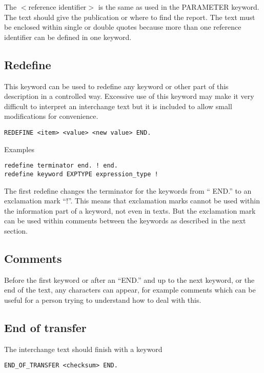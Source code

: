 \documentclass[12pt]{article}
\begin{document}
The $<$reference identifier$>$ is the same as used in the PARAMETER
keyword. The text should give the publication or where to find the
report. The text must be enclosed within single or double quotes
because more than one reference identifier can be defined in one
keyword.

\subsection{Redefine}

This keyword can be used to redefine any keyword or other part of
this description in a controlled way. Excessive use of this
keyword may make it very difficult to interpret an interchange text
but it is included to allow small modifications for convenience.

\begin{verbatim}
REDEFINE <item> <value> <new value> END.
\end{verbatim}

Examples

\begin{verbatim}
redefine terminator end. ! end.
redefine keyword EXPTYPE expression_type !
\end{verbatim}

The first redefine changes the terminator for the keywords from 
`` END.'' to an exclamation mark ``!''. This means that exclamation marks
cannot be used within the information part of a keyword, not even in
texts. But the exclamation mark can be used within comments between the
keywords as described in the next section.

\subsection{Comments}

Before the first keyword or after an ``END.'' and up to the next
keyword, or the end of the text, any characters can appear, for
example comments which can be useful for a person trying to understand
how to deal with this.

\subsection{End of transfer}

The interchange text should finish with a keyword

\begin{verbatim}
END_OF_TRANSFER <checksum> END.
\end{verbatim}
\end{document}

